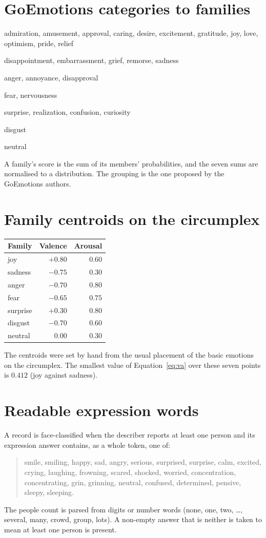 \section{GoEmotions categories to families}
\begin{description}\setlength{\itemsep}{1pt}
\item[joy] admiration, amusement, approval, caring, desire, excitement, gratitude, joy, love, optimism, pride, relief
\item[sadness] disappointment, embarrassment, grief, remorse, sadness
\item[anger] anger, annoyance, disapproval
\item[fear] fear, nervousness
\item[surprise] surprise, realization, confusion, curiosity
\item[disgust] disgust
\item[neutral] neutral
\end{description}
A family's score is the sum of its members' probabilities, and the seven sums are normalised to a distribution. The grouping is the one proposed by the GoEmotions authors.

\section{Family centroids on the circumplex}
\begin{center}
\begin{tabular}{lrr}
\toprule
Family & Valence & Arousal \\
\midrule
joy & $+0.80$ & $0.60$ \\
sadness & $-0.75$ & $0.30$ \\
anger & $-0.70$ & $0.80$ \\
fear & $-0.65$ & $0.75$ \\
surprise & $+0.30$ & $0.80$ \\
disgust & $-0.70$ & $0.60$ \\
neutral & $0.00$ & $0.30$ \\
\bottomrule
\end{tabular}
\end{center}
The centroids were set by hand from the usual placement of the basic emotions on the circumplex. The smallest value of Equation~\ref{eq:va} over these seven points is $0.412$ (joy against sadness).

\section{Readable expression words}
A record is face-classified when the describer reports at least one person and its expression answer contains, as a whole token, one of:
\begin{quote}
smile, smiling, happy, sad, angry, serious, surprised, surprise, calm, excited, crying, laughing, frowning, scared, shocked, worried, concentration, concentrating, grin, grinning, neutral, confused, determined, pensive, sleepy, sleeping.
\end{quote}
The people count is parsed from digits or number words (none, one, two, \ldots, several, many, crowd, group, lots). A non-empty answer that is neither is taken to mean at least one person is present.

